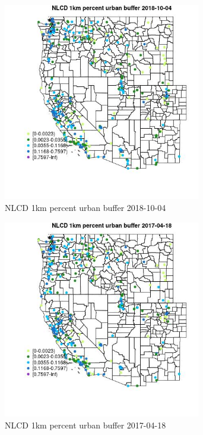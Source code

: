 \begin{figure} 
\centering  
\includegraphics[width=0.77\textwidth]{Code_Outputs/Report_ML_input_PM25_Step4_part_f_de_duplicated_aveswNAs_MapObsNLCD_1km_percent_urban_buffer2018-10-04.jpg} 
\caption{\label{fig:Report_ML_input_PM25_Step4_part_f_de_duplicated_aveswNAsMapObsNLCD_1km_percent_urban_buffer2018-10-04}NLCD 1km percent urban buffer 2018-10-04} 
\end{figure} 
 

\begin{figure} 
\centering  
\includegraphics[width=0.77\textwidth]{Code_Outputs/Report_ML_input_PM25_Step4_part_f_de_duplicated_aveswNAs_MapObsNLCD_1km_percent_urban_buffer2017-04-18.jpg} 
\caption{\label{fig:Report_ML_input_PM25_Step4_part_f_de_duplicated_aveswNAsMapObsNLCD_1km_percent_urban_buffer2017-04-18}NLCD 1km percent urban buffer 2017-04-18} 
\end{figure} 
 

